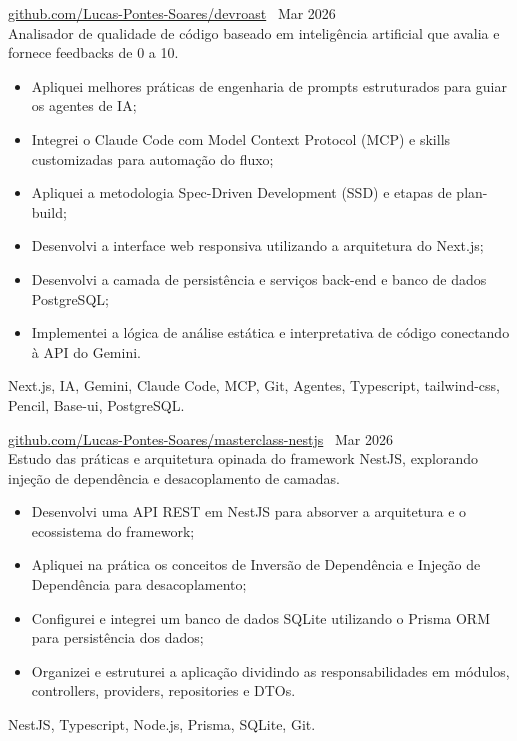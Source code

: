         
 \textbar{}  \href{https://github.com/Lucas-Pontes-Soares/devroast}{github.com/Lucas-Pontes-Soares/devroast} \hfill\ Mar 2026 \\
Analisador de qualidade de código baseado em inteligência artificial que avalia e fornece feedbacks de 0 a 10.
\begin{itemize}
    \item Apliquei melhores práticas de engenharia de prompts estruturados para guiar os agentes de IA;
    \item Integrei o Claude Code com Model Context Protocol (MCP) e skills customizadas para automação do fluxo;
    \item Apliquei a metodologia Spec-Driven Development (SSD) e etapas de plan-build;
    \item Desenvolvi a interface web responsiva utilizando a arquitetura do Next.js;
    \item Desenvolvi a camada de persistência e serviços back-end e banco de dados PostgreSQL;
    \item Implementei a lógica de análise estática e interpretativa de código conectando à API do Gemini.
\end{itemize}
 Next.js, IA, Gemini, Claude Code, MCP, Git, Agentes, Typescript, tailwind-css, Pencil, Base-ui, PostgreSQL.

        
 \textbar{}  \href{https://github.com/Lucas-Pontes-Soares/masterclass-nestjs}{github.com/Lucas-Pontes-Soares/masterclass-nestjs} \hfill\ Mar 2026 \\
Estudo das práticas e arquitetura opinada do framework NestJS, explorando injeção de dependência e desacoplamento de camadas.
\begin{itemize}
    \item Desenvolvi uma API REST em NestJS para absorver a arquitetura e o ecossistema do framework;
    \item Apliquei na prática os conceitos de Inversão de Dependência e Injeção de Dependência para desacoplamento;
    \item Configurei e integrei um banco de dados SQLite utilizando o Prisma ORM para persistência dos dados;
    \item Organizei e estruturei a aplicação dividindo as responsabilidades em módulos, controllers, providers, repositories e DTOs.
\end{itemize}
 NestJS, Typescript, Node.js, Prisma, SQLite, Git.

